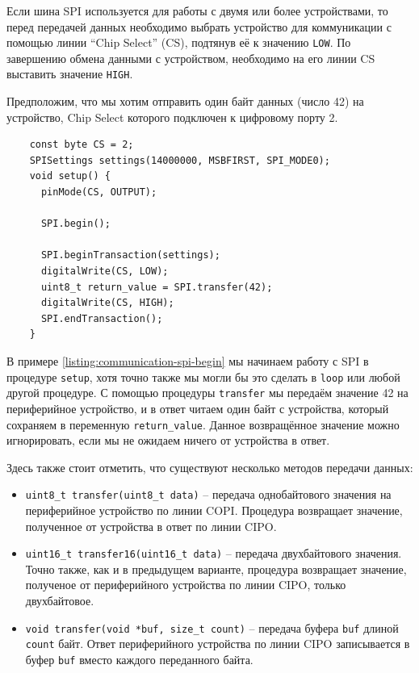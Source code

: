 \documentclass[../sparc.tex]{subfiles}
\begin{document}
Если шина SPI используется для работы с двумя или более устройствами, то перед
передачей данных необходимо выбрать устройство для коммуникации с помощью линии
``Chip Select'' (CS), подтянув её к значению \texttt{LOW}.  По завершению обмена
данными с устройством, необходимо на его линии CS выставить значение
\texttt{HIGH}.

Предположим, что мы хотим отправить один байт данных (число 42) на устройство,
Chip Select которого подключен к цифровому порту 2.

\begin{listing}[H]
  \begin{verbatim}
    const byte CS = 2;
    SPISettings settings(14000000, MSBFIRST, SPI_MODE0);
    void setup() {
      pinMode(CS, OUTPUT);

      SPI.begin();

      SPI.beginTransaction(settings);
      digitalWrite(CS, LOW);
      uint8_t return_value = SPI.transfer(42);
      digitalWrite(CS, HIGH);
      SPI.endTransaction();
    }
  \end{verbatim}
  \label{listing:communication-spi-begin}
  \caption{Пример работы с SPI.}
\end{listing}

В примере \ref{listing:communication-spi-begin} мы начинаем работу с SPI в
процедуре \texttt{setup}, хотя точно также мы могли бы это сделать в
\texttt{loop} или любой другой процедуре.  С помощью процедуры
\texttt{transfer} мы передаём значение 42 на периферийное устройство, и
в ответ читаем один байт с устройства, который сохраняем в переменную
\texttt{return_value}.  Данное возвращённое значение можно
игнорировать, если мы не ожидаем ничего от устройства в ответ.

Здесь также стоит отметить, что существуют несколько методов передачи данных:
\begin{itemize}
\item \texttt{uint8_t transfer(uint8_t data)} -- передача однобайтового
  значения на периферийное устройство по линии COPI.  Процедура возвращает
  значение, полученное от устройства в ответ по линии CIPO.
\item \texttt{uint16_t transfer16(uint16_t data)} -- передача
  двухбайтового значения.  Точно также, как и в предыдущем варианте, процедура
  возвращает значение, полученое от периферийного устройства по линии CIPO,
  только двухбайтовое.
\item \texttt{void transfer(void *buf, size_t count)} -- передача буфера
  \texttt{buf} длиной \texttt{count} байт.  Ответ
  периферийного устройства по линии CIPO записывается в буфер
  \texttt{buf} вместо каждого переданного байта.
\end{itemize}
\end{document}
